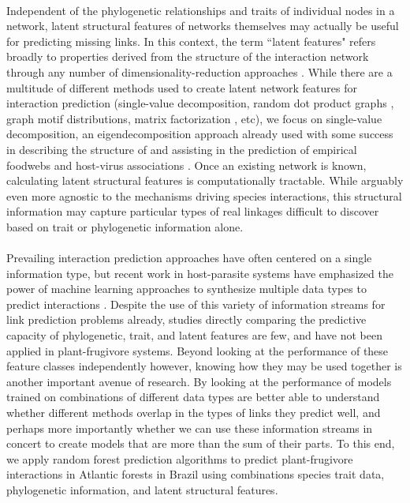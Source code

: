\documentclass[num-refs]{wiley-article}%
\begin{document}
\paragraph*{}
Independent of the phylogenetic relationships and traits of individual nodes in a network, latent structural features of networks themselves may actually be useful for predicting missing links. In this context, the term ``latent features" refers broadly to properties derived from the structure of the interaction network through any number of dimensionality-reduction approaches \cite{poisot2021imputing}. While there are a multitude of different methods used to create latent network features for interaction prediction (single-value decomposition, random dot product graphs \cite{strydom2022food}, graph motif distributions, matrix factorization \cite{seo2018predicting}, etc), we focus on single-value decomposition, an eigendecomposition approach already used with some success in describing the structure of and assisting in the prediction of empirical foodwebs \cite{banville2023constrains} and host-virus associations \cite{poisot2021imputing, poisot2023network}. Once an existing network is known, calculating latent structural features is computationally tractable. While arguably even more agnostic to the mechanisms driving species interactions, this structural information may capture particular types of real linkages difficult to discover based on trait or phylogenetic information alone. 


\paragraph*{}
Prevailing interaction prediction approaches have often centered on a single information type, but recent work in host-parasite systems have emphasized the power of machine learning approaches to synthesize multiple data types to predict interactions \cite{strydom2021roadmap}. Despite the use of this variety of information streams for link prediction problems already, studies directly comparing the predictive capacity of phylogenetic, trait, and latent features are few, and have not been applied in plant-frugivore systems. Beyond looking at the performance of these feature classes independently however, knowing how they may be used together is another important avenue of research. By looking at the performance of models trained on combinations of different data types are better able to understand whether different methods overlap in the types of links they predict well, and perhaps more importantly whether we can use these information streams in concert to create models that are more than the sum of their parts. To this end, we apply random forest prediction algorithms to predict plant-frugivore interactions in Atlantic forests in Brazil using combinations species trait data, phylogenetic information, and latent structural features. 
\end{document}

